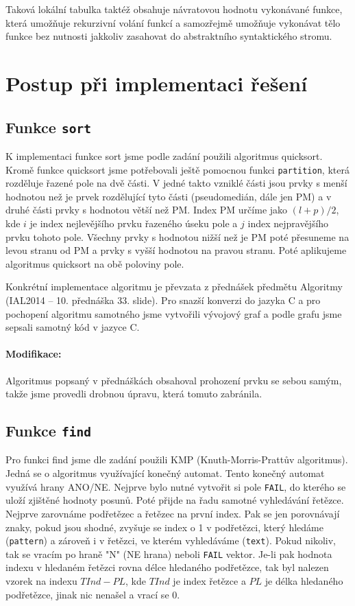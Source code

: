 \documentclass[12pt,a4paper,titlepage,final]{article}
\begin{document}
Taková lokální tabulka taktéž obsahuje návratovou hodnotu vykonávané funkce,
která umožňuje rekurzivní volání funkcí a samozřejmě umožňuje vykonávat tělo
funkce bez nutnosti jakkoliv zasahovat do abstraktního syntaktického stromu.


\section{Postup při implementaci řešení} \label{postup_pri_implementaci_reseni}
\subsection{Funkce \texttt{sort}}
K implementaci funkce sort jsme podle zadání použili algoritmus quicksort.
Kromě funkce quicksort jsme potřebovali ještě pomocnou funkci \verb|partition|,
která rozděluje řazené pole na dvě části. V jedné takto vzniklé části jsou prvky
s menší hodnotou než je prvek rozdělující tyto části (pseudomedián, dále jen PM)
a v druhé části prvky s hodnotou větší než PM. Index PM určíme jako $(l+p)/2$, kde
$i$ je index nejlevějšího prvku řazeného úseku pole a $j$ index nejpravějšího prvku
tohoto pole. Všechny prvky s hodnotou nižší než je PM poté přesuneme na levou
stranu od PM a prvky s vyšší hodnotou na pravou stranu. Poté aplikujeme algoritmus
quicksort na obě poloviny pole.

Konkrétní implementace algoritmu je převzata z přednášek předmětu Algoritmy
(IAL2014 \cite{honzik2} -- 10. přednáška 33. slide). Pro snazší konverzi do jazyka
C a pro pochopení algoritmu samotného jsme vytvořili vývojový graf a podle grafu
jsme sepsali samotný kód v jazyce C.

\paragraph{Modifikace:} Algoritmus popsaný v přednáškách obsahoval prohození
prvku se sebou samým, takže jsme provedli drobnou úpravu, která tomuto zabránila.

\subsection{Funkce \texttt{find}}
Pro funkci find jsme dle zadání použili KMP (Knuth-Morris-Prattův algoritmus).
Jedná se o algoritmus využívající konečný automat. Tento konečný automat využívá
hrany ANO/NE. Nejprve bylo nutné vytvořit si pole \verb|FAIL|, do kterého se
uloží zjištěné hodnoty posunů. Poté přijde na řadu samotné vyhledávání řetězce.
Nejprve zarovnáme podřetězec a řetězec na první index. Pak se jen porovnávají znaky,
pokud jsou shodné, zvyšuje se index o 1 v podřetězci, který hledáme (\verb|pattern|)
a zároveň i v řetězci, ve kterém vyhledáváme (\verb|text|). Pokud nikoliv, tak se
vracím po hraně "N" (NE hrana) neboli \verb|FAIL| vektor. Je-li pak hodnota indexu
v hledaném řetězci rovna délce hledaného podřetězce, tak byl nalezen vzorek na
indexu $TInd - PL$, kde $TInd$ je index řetězce a $PL$ je délka hledaného podřetězce,
jinak nic nenašel a vrací se 0.
\end{document}
